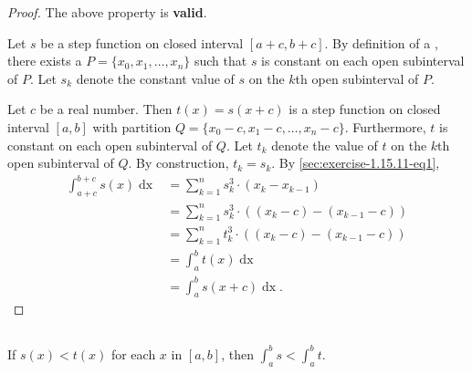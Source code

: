 \documentclass{report}
\begin{document}
\begin{proof}

  The above property is \textbf{valid}.

  \vspace{6pt}

  Let $s$ be a step function on closed interval $[a + c, b + c]$.
  By definition of a , there exists a  $P = \{x_0, x_1, \ldots, x_n\}$ such that $s$ is constant on each open subinterval of $P$.
  Let $s_k$ denote the constant value of $s$ on the $k$th open subinterval of $P$.

  Let $c$ be a real number.
  Then $t(x) = s(x + c)$ is a step function on closed interval $[a, b]$ with partition $Q = \{x_0 - c, x_1 - c, \ldots, x_n - c\}$.
  Furthermore, $t$ is constant on each open subinterval of $Q$.
  Let $t_k$ denote the value of $t$ on the $k$th open subinterval of $Q$.
  By construction, $t_k = s_k$.
  By \eqref{sec:exercise-1.15.11-eq1},
    \begin{align*}
      \int_{a+c}^{b+c} s(x) \mathop{dx}
        & = \sum_{k=1}^n s_k^3 \cdot (x_k - x_{k-1}) \\
        & = \sum_{k=1}^n s_k^3 \cdot ((x_k - c) - (x_{k-1} - c)) \\
        & = \sum_{k=1}^n t_k^3 \cdot ((x_k - c) - (x_{k-1} - c)) \\
        & = \int_a^b t(x) \mathop{dx} \\
        & = \int_a^b s(x + c) \mathop{dx}.
    \end{align*}

\end{proof}

\subsection{}%
\label{sub:exercise-1.15.11e}

If $s(x) < t(x)$ for each $x$ in $[a, b]$, then $\int_a^b s < \int_a^b t$.

\end{document}
